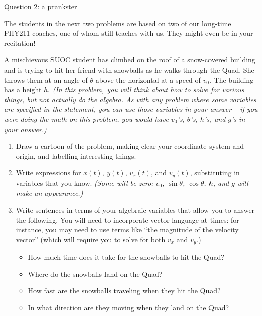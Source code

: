 \documentclass[12pt]{article}
\newcommand{\BI}{\begin{itemize}}
\newcommand{\EI}{\end{itemize}}
\begin{document}
\newpage

\centerline{\Large Question 2: a prankster}     

\footnotesize

\it \begin{center} The students in the next two problems are based on two of our long-time PHY211 coaches, one of whom still teaches with us. They might even be in your recitation! \end{center}

\normalsize \bigskip\rm

A mischievous SUOC student has climbed on the roof of a snow-covered building and is trying to hit her friend with snowballs as he walks through the Quad. 
She throws them at an angle of $\theta$ above the horizontal at a speed of $v_0$. 
The building has a height $h$. {\it (In this problem, you will think about how to solve for various things, but not actually do the algebra. As with any problem where some variables are specified in the statement, you can use
	those variables in your answer -- if you were doing the math on this problem, you would have $v_0$'s, $\theta$'s, $h$'s, and $g$'s in your answer.)}

\begin{enumerate}

\item Draw a cartoon of the problem, making clear your coordinate system and origin, and
labelling interesting things.

\vspace{2in}

\item Write expressions for $x(t)$, $y(t)$, $v_x(t)$, and $v_y(t)$, substituting in variables that you know. {\it (Some will be zero; $v_0$, $\sin \theta$, $\cos \theta$, $h$, and $g$ will make an appearance.)}


\newpage
\item Write sentences in terms of your algebraic variables that allow you to answer the following. You  
will need to incorporate vector language at times: for instance, you may need to use terms like ``the magnitude of the
velocity vector'' (which will require you to solve for both $v_x$ and $v_y$.)

\BI
\item How much time does it take for the snowballs to hit the Quad?

\vspace{1.5in}

\item Where do the snowballs land on the Quad?

\vspace{1.5in}
\item How fast are the snowballs traveling when they hit the Quad?

\vspace{1.5in}
\item In what direction are they moving when they land on the Quad?
\EI
\end{enumerate}
\end{document}
